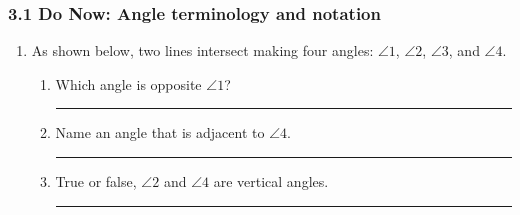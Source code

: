 \documentclass[12pt, twoside]{article}
\begin{document}
\subsubsection*{3.1 Do Now: Angle terminology and notation}
  \begin{enumerate}

  \item As shown below, two lines intersect making four angles: $\angle 1$, $\angle 2$, $\angle 3$, and $\angle 4$.
    \begin{center}
    \end{center}
    \begin{enumerate}
    \item Which angle is opposite $\angle 1$? \rule{4cm}{0.15mm} \bigskip
    \item Name an angle that is adjacent to $\angle 4$. \rule{4cm}{0.15mm} \bigskip
    \item True or false, $\angle 2$ and $\angle 4$ are vertical angles. \rule{3cm}{0.15mm}
  \end{enumerate}


\end{enumerate}
\end{document}
